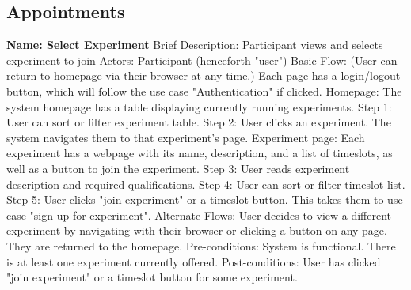 \subsection{Appointments}
\begin{outline}[enumerate]


\1 {\bf Name: Select Experiment}
\2 Brief Description: Participant views and selects experiment to join
\2 Actors: Participant (henceforth "user")
\2 Basic Flow: (User can return to homepage via their browser at any time.)  Each page has a login/logout button, which will follow the use case "Authentication" if clicked.
\3 Homepage: The system homepage has a table displaying currently running experiments.
\3 Step 1: User can sort or filter experiment table.
\3 Step 2: User clicks an experiment.  The system navigates them to that experiment's page.
\3 Experiment page: Each experiment has a webpage with its name, description, and a list of timeslots, as well as a button to join the experiment.
\3 Step 3: User reads experiment description and required qualifications.
\3 Step 4: User can sort or filter timeslot list.
\3 Step 5: User clicks "join experiment" or a timeslot button.  This takes them to use case "sign up for experiment".
\2 Alternate Flows:
\3 User decides to view a different experiment by navigating with their browser or clicking a button on any page.  They are returned to the homepage.
\2 Pre-conditions:
\3 System is functional.
\3 There is at least one experiment currently offered.
\2 Post-conditions:
\3 User has clicked "join experiment" or a timeslot button for some experiment.


\end{outline}
